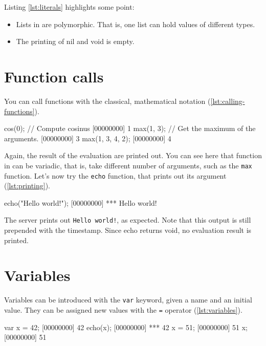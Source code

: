 Listing \ref{lst:literals} highlights some point:
\begin{itemize}
\item Lists in \urbi are polymorphic. That is, one list can hold
  values of different types.
\item The printing of nil and void is empty.
\end{itemize}

\section{Function calls}

You can call functions with the classical, mathematical notation
(\autoref{lst:calling-functions}).

\begin{urbiscript}[caption=Calling functions,label=lst:calling-functions]
cos(0); // Compute cosinus
[00000000] 1
max(1, 3); // Get the maximum of the arguments.
[00000000] 3
max(1, 3, 4, 2);
[00000000] 4
\end{urbiscript}

Again, the result of the evaluation are printed out. You can see here
that function in \urbi can be variadic, that is, take different number
of arguments, such as the \texttt{max} function. Let's now try the
\texttt{echo} function, that prints out its argument (\autoref{lst:printing}).

\begin{urbiscript}[caption=Printing out,label=lst:printing]
echo("Hello world!");
[00000000] *** Hello world!
\end{urbiscript}

The server prints out \texttt{Hello world!}, as expected. Note that
this output is still prepended with the timestamp. Since echo returns
void, no evaluation result is printed.

\section{Variables}

Variables can be introduced with the \texttt{var} keyword, given a
name and an initial value. They can be assigned new values with the
\texttt{=} operator (\autoref{lst:variables}).

\begin{urbiscript}[caption=Using variables,label=lst:variables]
var x = 42;
[00000000] 42
echo(x);
[00000000] *** 42
x = 51;
[00000000] 51
x;
[00000000] 51
\end{urbiscript}

